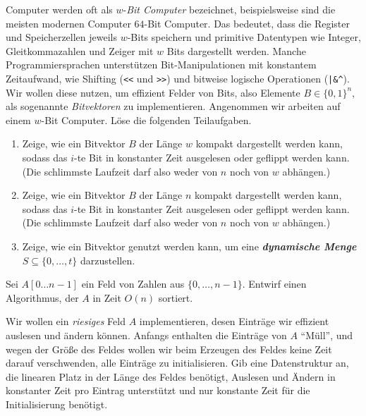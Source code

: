 \documentclass{uebung_cs}
\newcommand{\dynset}{\textit{\textbf{dynamische Menge}}}
\begin{document}
\begin{aufgabe}[Bitvektoren]
	Computer werden	oft als $w$-\textit{Bit Computer} bezeichnet, beispielsweise sind die meisten modernen Computer $64$-Bit Computer.
	Das bedeutet, dass die Register und Speicherzellen jeweils $w$-Bits speichern und primitive Datentypen wie Integer, Gleitkommazahlen und Zeiger mit $w$ Bits dargestellt werden.
	Manche Programmiersprachen unterstützen Bit-Manipulationen mit konstantem Zeitaufwand, wie Shifting (\verb$<<$ und \verb$>>$) und bitweise logische Operationen (\verb$|&^$).
	Wir wollen diese nutzen, um effizient Felder von Bits, also Elemente $B\in\{0,1\}^n$, als sogenannte \textit{Bitvektoren} zu implementieren.
	Angenommen wir arbeiten auf einem $w$-Bit Computer.
	Löse die folgenden Teilaufgaben.
	\begin{enumerate}
		\item Zeige, wie ein Bitvektor $B$ der Länge $w$ kompakt dargestellt werden kann, sodass das $i$-te Bit in konstanter Zeit ausgelesen oder geflippt werden kann. (Die schlimmste Laufzeit darf also weder von $n$ noch von $w$ abhängen.)
		\item Zeige, wie ein Bitvektor $B$ der Länge $n$ kompakt dargestellt werden kann, sodass das $i$-te Bit in konstanter Zeit ausgelesen oder geflippt werden kann. (Die schlimmste Laufzeit darf also weder von $n$ noch von $w$ abhängen.)
		\item Zeige, wie ein Bitvektor genutzt werden kann, um eine \dynset{} $S\subseteq\{0,\dots,t\}$ darzustellen.
	\end{enumerate}
\end{aufgabe}

\begin{aufgabe}
	Sei $A[0\hdots n-1]$ ein Feld von Zahlen aus $\{0, \dots, n-1\}$.
	Entwirf einen Algorithmus, der $A$ in Zeit $O(n)$ sortiert.
\end{aufgabe}

\begin{aufgabe}
	Wir wollen ein \textit{riesiges} Feld $A$ implementieren, desen Einträge wir effizient auslesen und ändern können.
	Anfangs enthalten die Einträge von $A$ \enquote{Müll}, und wegen der Größe des Feldes wollen wir beim Erzeugen des Feldes keine Zeit darauf verschwenden, alle Einträge zu initialisieren.
	Gib eine Datenstruktur an, die linearen Platz in der Länge des Feldes benötigt, Auslesen und Ändern in konstanter Zeit pro Eintrag unterstützt und nur konstante Zeit für die Initialisierung benötigt.
\end{aufgabe}
\end{document}
